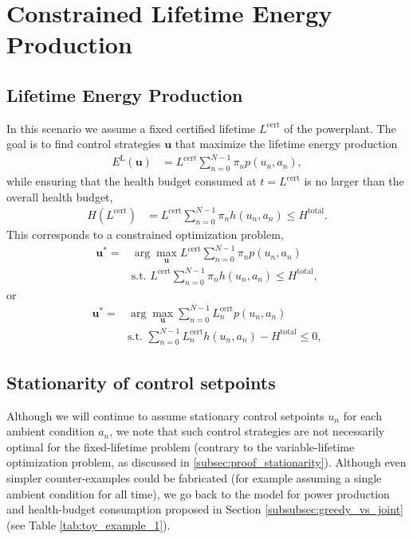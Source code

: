 \documentclass{article}
\begin{document}
    \section{Constrained Lifetime Energy Production}
    \subsection{Lifetime Energy Production}
    In this scenario we assume a fixed certified lifetime $L^\text{cert}$ of the powerplant. The goal is to find control strategies $\boldsymbol{u}$ that maximize the lifetime energy production
    \begin{align}
        E^\text{L}(\boldsymbol{u}) &= L^\text{cert} \sum_{n = 0}^{N - 1} \pi_n p(u_n, a_n),
    \end{align}
    while ensuring that the health budget consumed at $t = L^\text{cert}$ is no larger than the overall health budget,
    \begin{align}
        H(L^\text{cert}) & = L^\text{cert} \sum_{n = 0}^{N - 1} \pi_n h(u_n, a_n) \le H^\text{total}.
    \end{align}
    This corresponds to a constrained optimization problem,
    \begin{align}
        \boldsymbol{u}^* =& \arg \max_{\boldsymbol{u}} L^\text{cert} \sum_{n = 0}^{N - 1} \pi_n p(u_n, a_n)\\
        &\text{s.t. } L^\text{cert} \sum_{n = 0}^{N - 1} \pi_n h(u_n, a_n)\le H^\text{total},
    \end{align}
    or 
    \begin{align}
        \boldsymbol{u}^* =& \arg \max_{\boldsymbol{u}} \sum_{n = 0}^{N - 1} L^\text{cert} _n p(u_n, a_n)\\
        &\text{s.t. } \sum_{n = 0}^{N - 1} L^\text{cert} _n h(u_n, a_n) - H^\text{total} \le 0,
    \end{align}
    \subsection{Stationarity of control setpoints}
    Although we will continue to assume stationary control setpoints $u_n$ for each ambient condition $a_n$, we note that such control strategies are not necessarily optimal for the fixed-lifetime problem (contrary to the variable-lifetime optimization problem, as discussed in \ref{subsec:proof_stationarity}). Although even simpler counter-examples could be fabricated (for example assuming a single ambient condition for all time), we go back to the model for power production and health-budget consumption proposed in Section \ref{subsubsec:greedy_vs_joint} (see Table \ref{tab:toy_example_1}).
\end{document}
